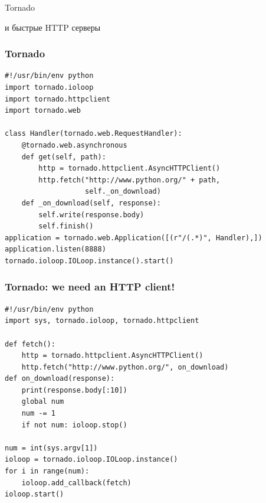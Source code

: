 \documentclass[aspectratio=169]{beamer}
\begin{document}
\begin{frame}
  \begin{center}
    {\Huge Tornado}

    и быстрые HTTP серверы
  \end{center}
\end{frame}


\begin{frame}[fragile]
  \frametitle{Tornado}
  \begin{lstlisting}
#!/usr/bin/env python
import tornado.ioloop
import tornado.httpclient
import tornado.web

class Handler(tornado.web.RequestHandler):
    @tornado.web.asynchronous
    def get(self, path):
        http = tornado.httpclient.AsyncHTTPClient()
        http.fetch("http://www.python.org/" + path,
                   self._on_download)
    def _on_download(self, response):
        self.write(response.body)
        self.finish()
application = tornado.web.Application([(r"/(.*)", Handler),])
application.listen(8888)
tornado.ioloop.IOLoop.instance().start()
  \end{lstlisting}
\end{frame}


\begin{frame}[fragile]
  \frametitle{Tornado: we need an HTTP client!}
  \begin{lstlisting}
#!/usr/bin/env python
import sys, tornado.ioloop, tornado.httpclient

def fetch():
    http = tornado.httpclient.AsyncHTTPClient()
    http.fetch("http://www.python.org/", on_download)
def on_download(response):
    print(response.body[:10])
    global num
    num -= 1
    if not num: ioloop.stop()

num = int(sys.argv[1])
ioloop = tornado.ioloop.IOLoop.instance()
for i in range(num):
    ioloop.add_callback(fetch)
ioloop.start()
  \end{lstlisting}
\end{frame}
\end{document}
